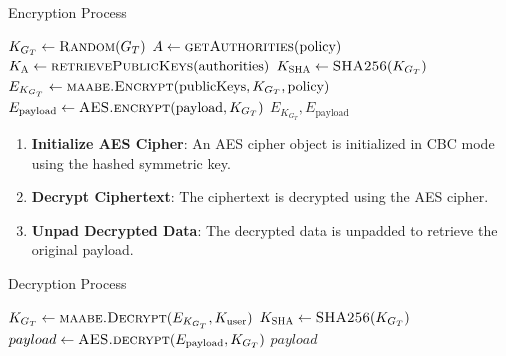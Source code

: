 \documentclass[cic,tc,english]{iiufrgs}
\begin{document}
                \begin{algorithm}
                    \caption{Encryption Process}
                    \label{alg:encryption_process}
                    \scriptsize
                    \begin{algorithmic}[1]
                        \State $K_{G_T} \gets \textsc{Random}(G_T)$
                        \State $A \gets \textsc{getAuthorities}(\text{policy})$
                        \State $K_{\textsc{A}} \gets \textsc{retrievePublicKeys}(\text{authorities})$
                        \State $K_{\textsc{SHA}} \gets \textsc{SHA256}(K_{G_T})$
                        \State $E_{K_{G_T}} \gets \textsc{maabe.Encrypt}(\text{publicKeys}, K_{G_T}, \text{policy})$
                        \State $E_{\text{payload}} \gets \textsc{AES.encrypt}(\text{payload}, K_{G_T})$
                        \State \Return $E_{K_{G_T}}, E_{\text{payload}}$
                    \EndProcedure
                    \end{algorithmic}
                \end{algorithm}


                \begin{enumerate}
                    \item \textbf{Initialize AES Cipher}: An AES cipher object is initialized in CBC mode using the hashed symmetric key.
                    \item \textbf{Decrypt Ciphertext}: The ciphertext is decrypted using the AES cipher.
                    \item \textbf{Unpad Decrypted Data}: The decrypted data is unpadded to retrieve the original payload.
                \end{enumerate}

                \begin{algorithm}
                    \caption{Decryption Process}
                    \label{alg:decryption_process}
                    \scriptsize
                    \begin{algorithmic}[1]
                        \State $K_{G_T} \gets \textsc{maabe.Decrypt}(E_{K_{G_T}}, K_{\text{user}})$
                        \State $K_{\textsc{SHA}} \gets \textsc{SHA256}(K_{G_T})$
                        \State $payload \gets \textsc{AES.decrypt}(E_{\text{payload}}, K_{G_T})$
                        \State \Return $payload$
                    \EndProcedure
                    \end{algorithmic}
                \end{algorithm}
\end{document}
